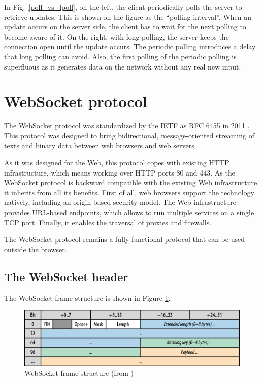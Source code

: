 \documentclass[10pt,journal,compsoc]{IEEEtran}
\newcommand{\ws}{WebSocket}
\begin{document}
In Fig.~\ref{poll_vs_lpoll}, on the left, the client periodically polls the server to retrieve updates. This is shown on the figure as the ``polling interval''. When an update occurs on the server side, the client has to wait for the next polling to become aware of it. On the right, with long polling, the server keeps the connection open until the update occurs. The periodic polling introduces a delay that long polling can avoid. Also, the first polling of the periodic polling is superfluous as it generates data on the network without any real new input.

\section{\ws{} protocol}
\label{sec:ws}
The \ws{} protocol was standardized by the IETF as RFC 6455 in 2011 \cite{rfc6455}.
This protocol was designed to bring bidirectional, message-oriented streaming of texts and binary data between web browsers and web servers.

As it was designed for the Web, this protocol copes with existing HTTP infrastructure, which means working over HTTP ports 80 and 443.
As the \ws{} protocol is backward compatible with the existing Web infrastructure, it inherits from all its benefits.
First of all, web browsers support the technology natively, including an origin-based security model. %
The Web infrastructure provides URL-based endpoints, which allows to run multiple services on a single TCP port.
Finally, it enables the traversal of proxies and firewalls.

The \ws{} protocol remains a fully functional protocol that can be used outside the browser.

\subsection{The \ws{} header}
\label{sec:ws-header}
The \ws{} frame structure is shown in Figure \ref{fig:websocket_frame}.

\begin{figure}
    \centering
    \includegraphics[width=\linewidth]{websocket_frame.png}
    \caption{\ws{} frame structure (from \cite{HighPerfBrowserNetworking:websocket})}
    \label{fig:websocket_frame}
\end{figure}
\end{document}
